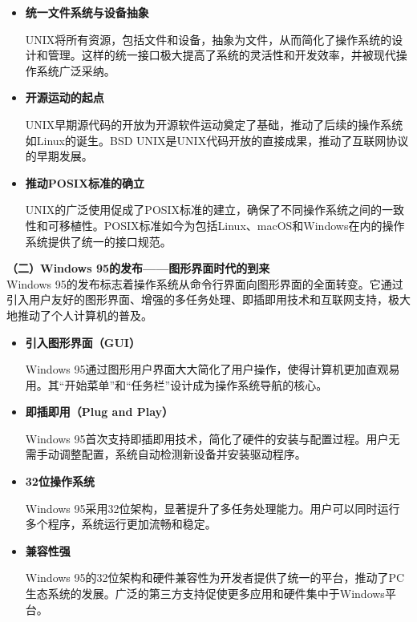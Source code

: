 \documentclass[UTF8]{homework}
\begin{document}
\begin{homeworkProblem}
\begin{itemize}
	\item \textbf{统一文件系统与设备抽象}
	
	UNIX将所有资源，包括文件和设备，抽象为文件，从而简化了操作系统的设计和管理。这样的统一接口极大提高了系统的灵活性和开发效率，并被现代操作系统广泛采纳。
	
	\item \textbf{开源运动的起点}
	
	UNIX早期源代码的开放为开源软件运动奠定了基础，推动了后续的操作系统如Linux的诞生。BSD UNIX是UNIX代码开放的直接成果，推动了互联网协议的早期发展。
	
	\item \textbf{推动POSIX标准的确立}
	
	UNIX的广泛使用促成了POSIX标准的建立，确保了不同操作系统之间的一致性和可移植性。POSIX标准如今为包括Linux、macOS和Windows在内的操作系统提供了统一的接口规范。\\
	
\end{itemize}

\textbf{（二）Windows 95的发布——图形界面时代的到来}\\

Windows 95的发布标志着操作系统从命令行界面向图形界面的全面转变。它通过引入用户友好的图形界面、增强的多任务处理、即插即用技术和互联网支持，极大地推动了个人计算机的普及。\\

\begin{itemize}
	\item \textbf{引入图形界面（GUI）}
	
	Windows 95通过图形用户界面大大简化了用户操作，使得计算机更加直观易用。其“开始菜单”和“任务栏”设计成为操作系统导航的核心。
	
	\item \textbf{即插即用（Plug and Play）}
	
	Windows 95首次支持即插即用技术，简化了硬件的安装与配置过程。用户无需手动调整配置，系统自动检测新设备并安装驱动程序。
	
	\item \textbf{32位操作系统}
	
	Windows 95采用32位架构，显著提升了多任务处理能力。用户可以同时运行多个程序，系统运行更加流畅和稳定。
	
	\item \textbf{兼容性强}
	
	Windows 95的32位架构和硬件兼容性为开发者提供了统一的平台，推动了PC生态系统的发展。广泛的第三方支持促使更多应用和硬件集中于Windows平台。
	

\end{itemize}
\end{homeworkProblem}
\end{document}
